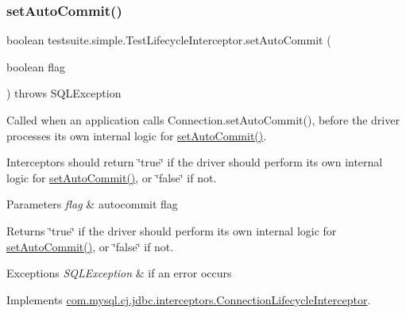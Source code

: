 \subsubsection{\texorpdfstring{set\+Auto\+Commit()}{setAutoCommit()}}
{\footnotesize\ttfamily boolean testsuite.\+simple.\+Test\+Lifecycle\+Interceptor.\+set\+Auto\+Commit (\begin{DoxyParamCaption}\item[{boolean}]{flag }\end{DoxyParamCaption}) throws S\+Q\+L\+Exception}

Called when an application calls Connection.\+set\+Auto\+Commit(), before the driver processes its own internal logic for \mbox{\hyperlink{classtestsuite_1_1simple_1_1_test_lifecycle_interceptor_a98376ea207527feed3bc76d491c98cc2}{set\+Auto\+Commit()}}.

Interceptors should return \char`\"{}true\char`\"{} if the driver should perform its own internal logic for \mbox{\hyperlink{classtestsuite_1_1simple_1_1_test_lifecycle_interceptor_a98376ea207527feed3bc76d491c98cc2}{set\+Auto\+Commit()}}, or \char`\"{}false\char`\"{} if not.


\begin{DoxyParams}{Parameters}
{\em flag} & autocommit flag \\
\hline
\end{DoxyParams}
\begin{DoxyReturn}{Returns}
\char`\"{}true\char`\"{} if the driver should perform its own internal logic for \mbox{\hyperlink{classtestsuite_1_1simple_1_1_test_lifecycle_interceptor_a98376ea207527feed3bc76d491c98cc2}{set\+Auto\+Commit()}}, or \char`\"{}false\char`\"{} if not.
\end{DoxyReturn}

\begin{DoxyExceptions}{Exceptions}
{\em S\+Q\+L\+Exception} & if an error occurs \\
\hline
\end{DoxyExceptions}


Implements \mbox{\hyperlink{interfacecom_1_1mysql_1_1cj_1_1jdbc_1_1interceptors_1_1_connection_lifecycle_interceptor_a59c4f11d95ed73bad5c35c6741c03197}{com.\+mysql.\+cj.\+jdbc.\+interceptors.\+Connection\+Lifecycle\+Interceptor}}.

\mbox{\label{classtestsuite_1_1simple_1_1_test_lifecycle_interceptor_accae42bd1b1d7a51fa35a6f375bf4ce4}} 
